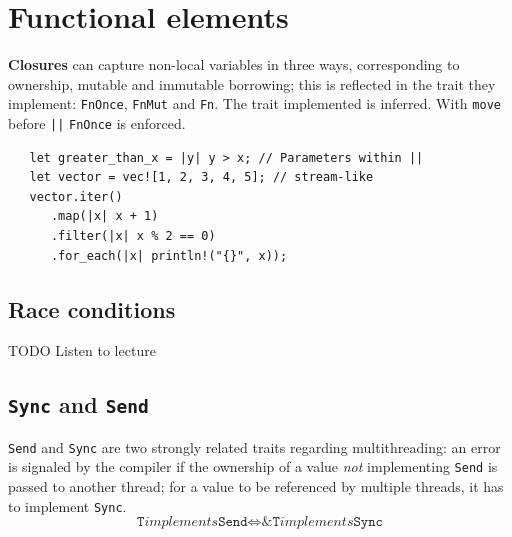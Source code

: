 \section{Functional elements}

\textbf{Closures} can capture non-local variables in three ways,
corresponding to ownership, mutable and immutable
borrowing; 
this is reflected in the trait they implement: \lstinline|FnOnce|,
\lstinline|FnMut| and \lstinline|Fn|.
The trait implemented is inferred.
With \lstinline|move| before \lstinline{||} \lstinline|FnOnce| is enforced.
\begin{lstlisting}
   let greater_than_x = |y| y > x; // Parameters within ||
   let vector = vec![1, 2, 3, 4, 5]; // stream-like
   vector.iter()
      .map(|x| x + 1)
      .filter(|x| x % 2 == 0)
      .for_each(|x| println!("{}", x));
\end{lstlisting}

\subsection{Race conditions}
TODO Listen to lecture
\nl

\subsection{\texttt{Sync} and \texttt{Send}}
\lstinline|Send| and \lstinline|Sync| are two strongly related traits regarding multithreading: 
an error is signaled by the compiler if the ownership of
a value \textit{not} implementing \lstinline|Send| is passed to another thread;
for a value to be referenced by multiple threads, it has to
implement \lstinline|Sync|.
\begin{equation}
   \texttt{T} \textit{implements} \texttt{Send} \Leftrightarrow \texttt{\&T} \textit{implements} \texttt{Sync}
\end{equation}
